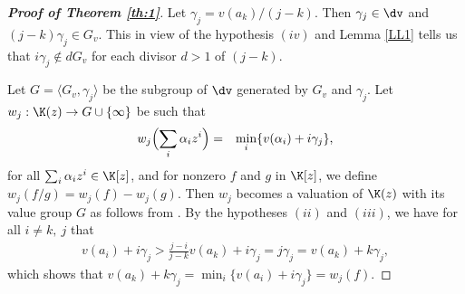 \documentclass[12pt]{amsart}%
\begin{document}
\begin{proof}[\bf Proof of Theorem \ref{th:1}]
Let $\gamma_j=v(a_k)/(j-k)$. Then $\gamma_j\in \dv$ and $(j-k)\gamma_j\in G_v$. This in view of the hypothesis $(iv)$  and Lemma \ref{LL1} tells us that $i\gamma_j\not\in dG_v$ for each divisor $d>1$ of $(j-k)$.

Let $G=\langle G_v,\gamma_j\rangle$ be the subgroup of $\dv$ generated by $G_v$ and $\gamma_j$.
Let $w_j:\K(z)\rightarrow G\cup\{\infty\}$ be such that
\begin{eqnarray*}
w_j\Bigl(\sum_{i}\alpha_i z^i\Bigr) &=& \min_i\{v(\alpha_i)+i\gamma_j\},
\end{eqnarray*}
for all $\sum_{i}\alpha_i z^i\in \K[z]$, and for nonzero $f$ and $g$ in $\K[z]$, we define $w_j(f/g)=w_j(f)-w_j(g)$. Then $w_j$ becomes a valuation of $\K(z)$ with its value group $G$ as follows from \cite[Theorem 2.2]{EP}. By the hypotheses $(ii)$ and $(iii)$, we have for all $i\neq k,~j$ that
\begin{eqnarray*}
v(a_i)+i\gamma_j>\frac{j-i}{j-k}v(a_k)+i\gamma_j=j\gamma_j= v(a_k)+k\gamma_j,
\end{eqnarray*}
which shows that $v(a_k)+k\gamma_j=\min_i\{v(a_i)+i\gamma_j\}=w_j(f)$.


\end{proof}
\end{document}
